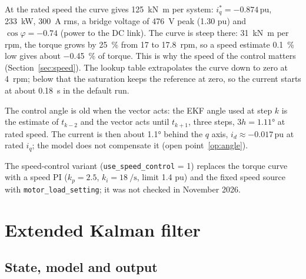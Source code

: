 \documentclass[11pt,a4paper]{scrartcl}
\newcommand{\code}[1]{\texttt{#1}}
\newcommand{\pun}{\,\mathrm{pu}}
\begin{document}
\begin{onehalfspace}
At the rated speed the curve gives \SI{125}{\kilo\newton\metre} per system: $i_q^* = -0.874\pun$, \SI{233}{\kilo\watt}, \SI{300}{\ampere} rms, a bridge voltage of \SI{476}{\volt} peak (\SI{1.30}{} pu) and $\cos\varphi = -0.74$ (power to the DC link). The curve is steep there: \SI{31}{\kilo\newton\metre} per rpm, the torque grows by \SI{25}{\percent} from 17 to \SI{17.8}{rpm}, so a speed estimate \SI{0.1}{\percent} low gives about \SI{-0.45}{\percent} of torque. This is why the speed of the control matters (Section~\ref{sec:speed}). The lookup table extrapolates the curve down to zero at \SI{4}{rpm}; below that the saturation keeps the reference at zero, so the current starts at about \SI{0.18}{\second} in the default run.

The control angle is old when the vector acts: the EKF angle used at step $k$ is the estimate of $t_{k-2}$ and the vector acts until $t_{k+1}$, three steps, $3h = \ang{1.11}$ at rated speed. The current is then about \ang{1.1} behind the $q$ axis, $i_d \approx -0.017\pun$ at rated $i_q$; the model does not compensate it (open point~\ref{op:angle}).

The speed-control variant (\code{use\_speed\_control} = 1) replaces the torque curve with a speed PI ($k_p = 2.5$, $k_i = \SI{18}{\per\second}$, limit \SI{1.4}{} pu) and the fixed speed source with \code{motor\_load\_setting}; it was not checked in November 2026.

\section{Extended Kalman filter}
\label{sec:ekf}

\subsection{State, model and output}


\end{onehalfspace}
\end{document}
